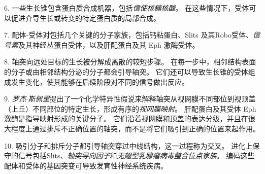 6. 一些生长锥包含蛋白质合成机器，包括\textit{信使核糖核酸}。
在这些情况下，受体可以促进介导生长或转变的特定蛋白质的局部合成。


7. 配体-受体对包括几个关键的分子家族，包括钙粘蛋白、Slits 及其Robo受体、\textit{信号素}及其神经丛蛋白受体，以及肝配蛋白及其 Eph 激酶受体。


8. 轴突向远处目标的生长被分解成离散的较短步骤。 
在每一步中，相邻结构表面的分子或由相邻结构分泌的分子都会引导轴突。
它们还可以导致生长锥的受体组成发生变化，使其能够在后续阶段对不同的信号做出反应。


9. \textit{罗杰$\cdot$斯佩里}提出了一个化学特异性假说来解释轴突从视网膜不同部位到视顶盖（上丘）不同部位的特定生长，形成有序的\textit{视网膜映射}。
肝配蛋白及其受体 Eph 激酶是指导映射形成的关键分子。
它们沿着视网膜和顶盖的表达分级，并且在很大程度上通过排斥不正确位置的轴突，而不是将它们吸引到正确的位置来起作用。


10. 吸引分子和排斥分子都引导轴突穿过中线结构，这一过程称为交叉。
进化上保守的信号包括Slits、\textit{轴突导向因子}和\textit{无翅型乳腺瘤病毒整合位点家族}。
编码这些配体和受体的基因突变可导致发育性神经系统疾病。

